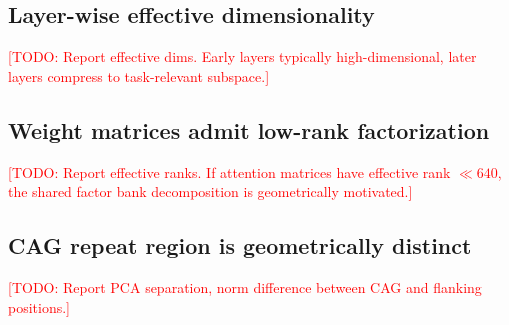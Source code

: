 \documentclass[11pt]{article}
\newcommand{\TODO}[1]{\textcolor{red}{[TODO: #1]}}
\begin{document}

\subsection{Layer-wise effective dimensionality}

\TODO{Report effective dims. Early layers typically high-dimensional,
later layers compress to task-relevant subspace.}


\subsection{Weight matrices admit low-rank factorization}

\TODO{Report effective ranks. If attention matrices have effective
rank $\ll 640$, the shared factor bank decomposition is geometrically
motivated.}


\subsection{CAG repeat region is geometrically distinct}

\TODO{Report PCA separation, norm difference between CAG and flanking
positions.}

\end{document}
